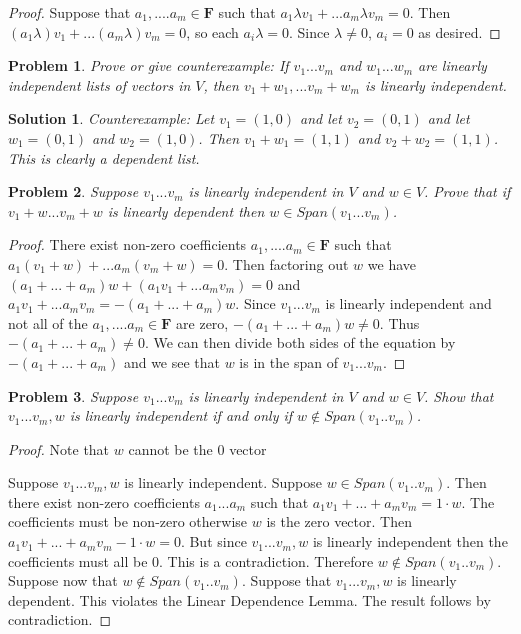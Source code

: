 \documentclass{article}
\theoremstyle{problemstyle}
\newtheorem{problem}{Problem}
\theoremstyle{problemstyle}
\newtheorem{solution}{Solution}
\begin{document}
\begin{proof}
Suppose that $a_1,....a_m \in \textbf{F}$ such that $a_1\lambda v_1+...a_m \lambda v_m = 0$. Then $(a_1\lambda) v_1+...(a_m \lambda) v_m = 0$, so each $a_i\lambda = 0$. Since $\lambda \neq 0$, $a_i = 0$ as desired. 
\end{proof}

\begin{problem}
Prove or give counterexample: If $v_1...v_m$ and $w_1...w_m$ are linearly independent lists of vectors in $V$, then $v_1+w_1,...v_m+w_m$ is linearly independent. 
\end{problem}

\begin{solution}
Counterexample: Let $v_1 = (1,0)$ and let $v_2 = (0,1)$ and let $w_1 = (0,1)$ and $w_2 = (1,0)$. Then $v_1+w_1 = (1,1)$ and $v_2+w_2 = (1,1)$. This is clearly a dependent list. 
\end{solution}

\begin{problem}
Suppose $v_1...v_m$ is linearly independent in $V$ and $w \in V$. Prove that if $v_1+w ... v_m+w$ is linearly dependent then $w \in Span(v_1...v_m)$. 
\end{problem}

\begin{proof}
There exist non-zero coefficients $a_1,....a_m \in \textbf{F}$ such that $a_1(v_1+w)+...a_m(v_m+w) = 0$. Then factoring out $w$ we have $(a_1+...+a_m)w+(a_1v_1+...a_mv_m) = 0$ and $a_1v_1+...a_mv_m = -(a_1+...+a_m)w$. Since $v_1...v_m$ is linearly independent and not all of the $a_1,....a_m \in \textbf{F}$ are zero, $-(a_1+...+a_m)w \neq 0$. Thus $-(a_1+...+a_m) \neq 0$. We can then divide both sides of the equation by $-(a_1+...+a_m)$ and we see that $w$ is in the span of $v_1...v_m$. 
\end{proof}

\begin{problem}
Suppose $v_1...v_m$ is linearly independent in $V$ and $w \in V$. Show that $v_1...v_m,w$ is linearly independent if and only if $w \notin Span(v_1 .. v_m)$.
\end{problem}

\begin{proof}
Note that $w$ cannot be the $0$ vector

Suppose $v_1...v_m,w$ is linearly independent. Suppose $w \in Span(v_1 .. v_m)$. Then there exist non-zero coefficients $a_1...a_m$ such that $a_1v_1+...+a_mv_m = 1\cdot w$. The coefficients must be non-zero otherwise $w$ is the zero vector. Then $a_1v_1+...+a_mv_m-1\cdot w = 0$. But since $v_1...v_m,w$ is linearly independent then the coefficients must all be 0. This is a contradiction. Therefore  $w \notin Span(v_1 .. v_m)$.\\ 

Suppose now that $w \notin Span(v_1 .. v_m)$. Suppose that $v_1...v_m,w$ is linearly dependent. This violates the Linear Dependence Lemma. The result follows by contradiction.  
\end{proof}
\end{document}
